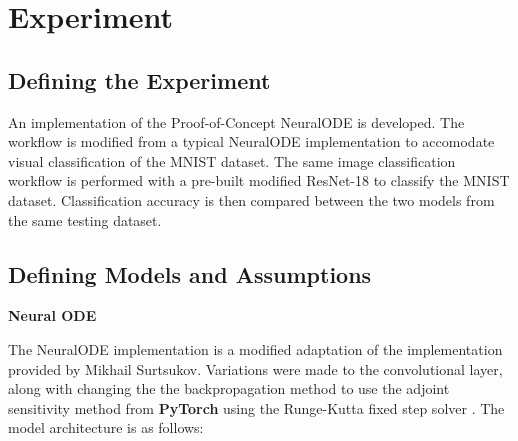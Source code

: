 \documentclass{article}
\begin{document}
\section{Experiment}

\subsection{Defining the Experiment}

An implementation of the Proof-of-Concept NeuralODE is developed. The workflow is modified from a
typical NeuralODE implementation to accomodate visual classification of the MNIST dataset. The same image
classification workflow is performed with a pre-built modified ResNet-18 to classify the MNIST dataset.
Classification accuracy is then compared between the two models from the same testing dataset.

\subsection{Defining Models and Assumptions}

\textbf{Neural ODE}

The NeuralODE implementation is a modified adaptation of the implementation provided by Mikhail Surtsukov. 
Variations were made to the convolutional layer, along with changing the the backpropagation method to use
the adjoint sensitivity method from \textbf{PyTorch} using the Runge-Kutta fixed step solver \cite{19Surtsukov, 23AI}.
The model architecture is as follows:
\end{document}
